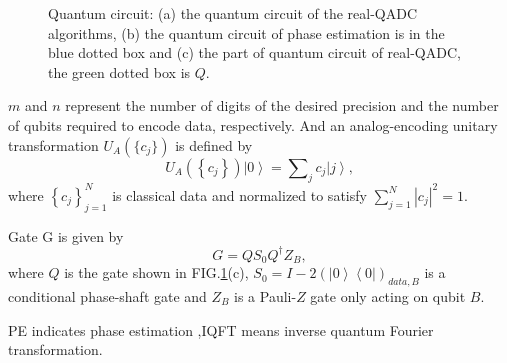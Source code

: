 \documentclass[%
 reprint,
 amsmath,amssymb,
pra,
]{revtex4-1}
\begin{document}
\begin{figure}[htbp]
 \caption{Quantum circuit: (a) the quantum circuit of the real-QADC algorithms, 
 (b) the quantum circuit of phase estimation is in the blue dotted box
 and (c) the part of quantum circuit of real-QADC, the green dotted box is $Q$.}
 \label{QADC_fig}
\end{figure}

$m$ and $n$ represent the number of digits of the desired precision and the number of qubits required to encode data, respectively.
And an analog-encoding unitary transformation $U_A(\{c_j\})$ is defined by
\begin{equation}
U_A\left( {\left\{ {{c_j}} \right\}} \right)\left| 0 \right\rangle  = \sum\nolimits_j {{c_j}\left| j \right\rangle },
\end{equation}
where $\left\{ {{c_j}} \right\}_{j = 1}^N$ is classical data and normalized to satisfy $\sum\nolimits_{j = 1}^N {{{\left| {{c_j}} \right|}^2}}  = 1$.

Gate G is given by
\begin{equation}
G = Q{S_0}{Q^\dag }{Z_B},
\end{equation}
where $Q$ is the gate shown in FIG.\ref{QADC_fig}(c), ${S_0} = I - 2{\left( {\left| 0 \right\rangle \left\langle 0 \right|} \right)_{data,B}}$
is a conditional phase-shaft gate and ${Z_B}$ is a Pauli-$Z$ gate only acting on qubit $B$.

PE indicates phase estimation ,IQFT means inverse quantum Fourier transformation\cite{nielsen_quantum_2002}.
\end{document}
